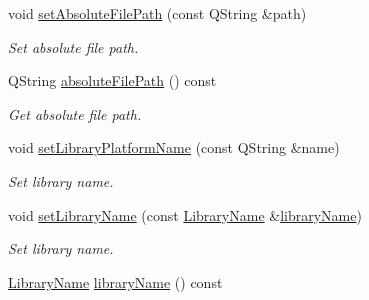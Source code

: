 \begin{DoxyCompactItemize}
\item 
void \hyperlink{class_mdt_1_1_deploy_utils_1_1_library_info_a0b7af709bcbd3c3b7f22e954d11ff812}{set\+Absolute\+File\+Path} (const Q\+String \&path)\hypertarget{class_mdt_1_1_deploy_utils_1_1_library_info_a0b7af709bcbd3c3b7f22e954d11ff812}{}\label{class_mdt_1_1_deploy_utils_1_1_library_info_a0b7af709bcbd3c3b7f22e954d11ff812}

\begin{DoxyCompactList}\small\item\em Set absolute file path. \end{DoxyCompactList}\item 
Q\+String \hyperlink{class_mdt_1_1_deploy_utils_1_1_library_info_a698bb904c4bbb50034b0a47f68c1c89a}{absolute\+File\+Path} () const \hypertarget{class_mdt_1_1_deploy_utils_1_1_library_info_a698bb904c4bbb50034b0a47f68c1c89a}{}\label{class_mdt_1_1_deploy_utils_1_1_library_info_a698bb904c4bbb50034b0a47f68c1c89a}

\begin{DoxyCompactList}\small\item\em Get absolute file path. \end{DoxyCompactList}\item 
void \hyperlink{class_mdt_1_1_deploy_utils_1_1_library_info_aaa4bbfc9f8640f3d152e59c4e7763cf2}{set\+Library\+Platform\+Name} (const Q\+String \&name)
\begin{DoxyCompactList}\small\item\em Set library name. \end{DoxyCompactList}\item 
void \hyperlink{class_mdt_1_1_deploy_utils_1_1_library_info_acd5102f7ca77e51efde466342b27f0ce}{set\+Library\+Name} (const \hyperlink{class_mdt_1_1_deploy_utils_1_1_library_name}{Library\+Name} \&\hyperlink{class_mdt_1_1_deploy_utils_1_1_library_info_a6d3a8bd86079dfe21b3e1fcde3d6e068}{library\+Name})
\begin{DoxyCompactList}\small\item\em Set library name. \end{DoxyCompactList}\item 
\hyperlink{class_mdt_1_1_deploy_utils_1_1_library_name}{Library\+Name} \hyperlink{class_mdt_1_1_deploy_utils_1_1_library_info_a6d3a8bd86079dfe21b3e1fcde3d6e068}{library\+Name} () const \hypertarget{class_mdt_1_1_deploy_utils_1_1_library_info_a6d3a8bd86079dfe21b3e1fcde3d6e068}{}\label{class_mdt_1_1_deploy_utils_1_1_library_info_a6d3a8bd86079dfe21b3e1fcde3d6e068}


\end{DoxyCompactItemize}
